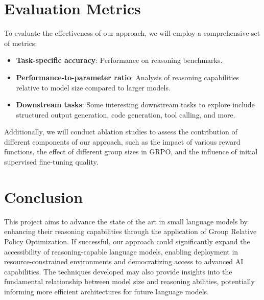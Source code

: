\documentclass[11pt, oneside]{article}   	%
\begin{document}
\section*{Evaluation Metrics}

To evaluate the effectiveness of our approach, we will employ a comprehensive set of metrics:

\begin{itemize}
	\item \textbf{Task-specific accuracy}: Performance on reasoning benchmarks.

	\item \textbf{Performance-to-parameter ratio}: Analysis of reasoning capabilities relative to model size compared to larger models.

	\item \textbf{Downstream tasks}: Some interesting downstream tasks to explore include structured output generation, code generation, tool calling, and more.
\end{itemize}

Additionally, we will conduct ablation studies to assess the contribution of different components of our approach, such as the impact of various reward functions, the effect of different group sizes in GRPO, and the influence of initial supervised fine-tuning quality.

\section*{Conclusion}

This project aims to advance the state of the art in small language models by enhancing their reasoning capabilities through the application of Group Relative Policy Optimization. If successful, our approach could significantly expand the accessibility of reasoning-capable language models, enabling deployment in resource-constrained environments and democratizing access to advanced AI capabilities. The techniques developed may also provide insights into the fundamental relationship between model size and reasoning abilities, potentially informing more efficient architectures for future language models.

\printbibliography
\end{document}
